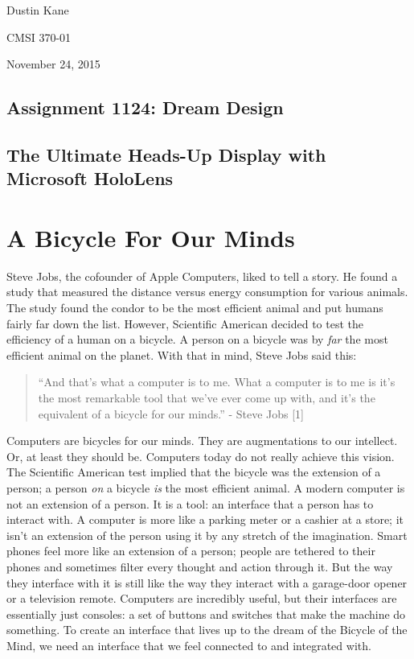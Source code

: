 \documentclass[a4paper,12pt]{article}
\begin{document}
Dustin Kane

CMSI 370-01

November 24, 2015

\begin{center}
\section*{Assignment 1124: Dream Design}
\subsection*{The Ultimate Heads-Up Display with Microsoft HoloLens}
\end{center}

\section{A Bicycle For Our Minds}

Steve Jobs, the cofounder of Apple Computers, liked to tell a story. He found a study that measured the distance versus energy consumption for various animals. The study found the condor to be the most efficient animal and put humans fairly far down the list. However, Scientific American decided to test the efficiency of a human on a bicycle. A person on a bicycle was by \emph{far} the most efficient animal on the planet. With that in mind, Steve Jobs said this:

\begin{quote} 
    ``And that's what a computer is to me. What a computer is to me is it's the most remarkable tool that we've ever come up with, and it's the equivalent of a bicycle for our minds.'' - Steve Jobs [1]
\end{quote}

Computers are bicycles for our minds. They are augmentations to our intellect. Or, at least they should be. Computers today do not really achieve this vision. The Scientific American test implied that the bicycle was the extension of a person; a person \emph{on} a bicycle \emph{is} the most efficient animal. A modern computer is not an extension of a person. It is a tool: an interface that a person has to interact with. A computer is more like a parking meter or a cashier at a store; it isn't an extension of the person using it by any stretch of the imagination. Smart phones feel more like an extension of a person; people are tethered to their phones and sometimes filter every thought and action through it. But the way they interface with it is still like the way they interact with a garage-door opener or a television remote. Computers are incredibly useful, but their interfaces are essentially just consoles: a set of buttons and switches that make the machine do something. To create an interface that lives up to the dream of the Bicycle of the Mind, we need an interface that we feel connected to and integrated with.
\end{document}
